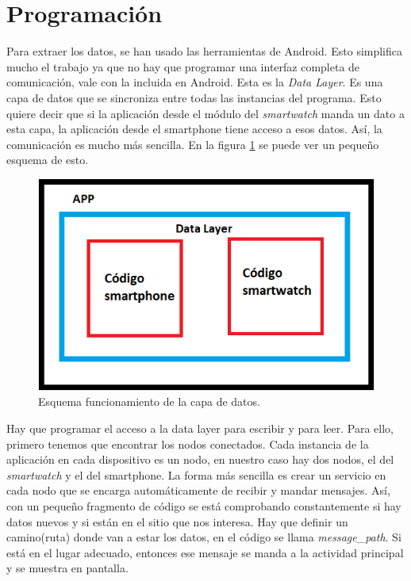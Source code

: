 \documentclass[12pt]{book}
\numberwithin{equation}{section}
\begin{document}
\section{Programación}

Para extraer los datos, se han usado las herramientas de Android. Esto simplifica mucho el trabajo ya que no hay que programar una interfaz completa de comunicación, vale con la incluida en Android. Esta es la \textit{Data Layer}. Es una capa de datos que se sincroniza entre todas las instancias del programa. Esto quiere decir que si la aplicación desde el módulo del \textit{smartwatch} manda un dato a esta capa, la aplicación desde el smartphone tiene acceso a esos datos. Así, la comunicación es mucho más sencilla. En la figura \ref{fig:datalayer} se puede ver un pequeño esquema de esto.

\begin{figure}[h]
    \centering
    \includegraphics[width=1\textwidth]{esquemacodigo.png}
    \caption{Esquema funcionamiento de la capa de datos.}
    \label{fig:datalayer}
\end{figure}


Hay que programar el acceso a la data layer para escribir y para leer. Para ello, primero tenemos que encontrar los nodos conectados. Cada instancia de la aplicación en cada dispositivo es un nodo, en nuestro caso hay dos nodos, el del \textit{smartwatch} y el del smartphone. La forma más sencilla es crear un servicio en cada nodo que se encarga automáticamente de recibir y mandar mensajes. Así, con un pequeño fragmento de código se está comprobando constantemente si hay datos nuevos y si están en el sitio que nos interesa. Hay que definir un camino(ruta) donde van a estar los datos, en el código se llama \textit{message\_path}. Si está en el lugar adecuado, entonces ese mensaje se manda a la actividad principal y se muestra en pantalla.
\end{document}

